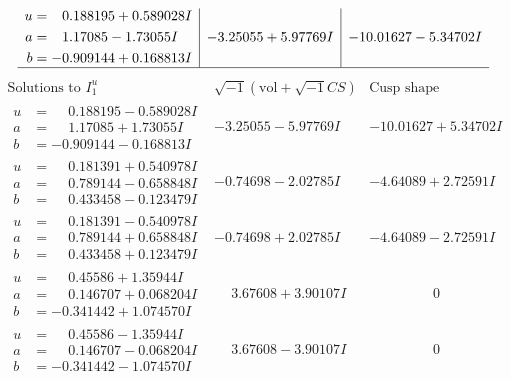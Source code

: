 \documentclass[1p]{elsarticle_modified}
\theoremstyle{definition}
\newcommand{\I}{\sqrt{-1}}
\begin{document}
$$\begin{array}{c|c|c}
\begin{aligned}
u &= \phantom{-}0.188195 + 0.589028 I \\
a &= \phantom{-}1.17085 - 1.73055 I \\
b &= -0.909144 + 0.168813 I\end{aligned}
 & -3.25055 + 5.97769 I & -10.01627 - 5.34702 I\\
 \hline 
 \end{array}$$\newpage$$\begin{array}{c|c|c}  
\text{Solutions to }I^u_{1}& \I (\text{vol} + \sqrt{-1}CS) & \text{Cusp shape}\\
 \hline 
\begin{aligned}
u &= \phantom{-}0.188195 - 0.589028 I \\
a &= \phantom{-}1.17085 + 1.73055 I \\
b &= -0.909144 - 0.168813 I\end{aligned}
 & -3.25055 - 5.97769 I & -10.01627 + 5.34702 I \\ \hline\begin{aligned}
u &= \phantom{-}0.181391 + 0.540978 I \\
a &= \phantom{-}0.789144 - 0.658848 I \\
b &= \phantom{-}0.433458 - 0.123479 I\end{aligned}
 & -0.74698 - 2.02785 I & -4.64089 + 2.72591 I \\ \hline\begin{aligned}
u &= \phantom{-}0.181391 - 0.540978 I \\
a &= \phantom{-}0.789144 + 0.658848 I \\
b &= \phantom{-}0.433458 + 0.123479 I\end{aligned}
 & -0.74698 + 2.02785 I & -4.64089 - 2.72591 I \\ \hline\begin{aligned}
u &= \phantom{-}0.45586 + 1.35944 I \\
a &= \phantom{-}0.146707 + 0.068204 I \\
b &= -0.341442 + 1.074570 I\end{aligned}
 & \phantom{-}3.67608 + 3.90107 I & \phantom{-0.000000 } 0 \\ \hline\begin{aligned}
u &= \phantom{-}0.45586 - 1.35944 I \\
a &= \phantom{-}0.146707 - 0.068204 I \\
b &= -0.341442 - 1.074570 I\end{aligned}
 & \phantom{-}3.67608 - 3.90107 I & \phantom{-0.000000 } 0 \\ \hline\begin{aligned}

\end{aligned}
\end{array}$$
\end{document}
